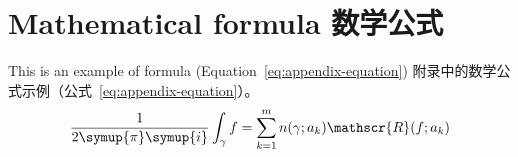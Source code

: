 \section{Mathematical formula 数学公式}

This is an example of formula (Equation~\eqref{eq:appendix-equation})
附录中的数学公式示例（公式~\eqref{eq:appendix-equation}）。
\begin{equation}
  \frac{1}{2 \symup{\pi} \symup{i}} \int_\gamma f = \sum_{k=1}^m n(\gamma; a_k) \mathscr{R}(f; a_k)
  \label{eq:appendix-equation}
\end{equation}